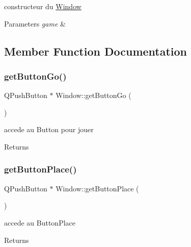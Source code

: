 constructeur du \mbox{\hyperlink{class_window}{Window}} 


\begin{DoxyParams}{Parameters}
{\em game} & \\
\hline
\end{DoxyParams}


\subsection{Member Function Documentation}
\mbox{\label{class_window_a1ae19e5cb4129fcf241af162e00ccb99}} 
\subsubsection{\texorpdfstring{get\+Button\+Go()}{getButtonGo()}}
{\footnotesize\ttfamily Q\+Push\+Button $\ast$ Window\+::get\+Button\+Go (\begin{DoxyParamCaption}{ }\end{DoxyParamCaption})\hspace{0.3cm}{\ttfamily [inline]}}



accede au Button pour jouer 

\begin{DoxyReturn}{Returns}

\end{DoxyReturn}
\mbox{\label{class_window_ab97872ecccc1e1019ca123fb3643c864}} 
\subsubsection{\texorpdfstring{get\+Button\+Place()}{getButtonPlace()}}
{\footnotesize\ttfamily Q\+Push\+Button $\ast$ Window\+::get\+Button\+Place (\begin{DoxyParamCaption}{ }\end{DoxyParamCaption})\hspace{0.3cm}{\ttfamily [inline]}}



accede au Button\+Place 

\begin{DoxyReturn}{Returns}

\end{DoxyReturn}
\mbox{\label{class_window_a1a60012c708f7e312c7c084ff923681c}} 
